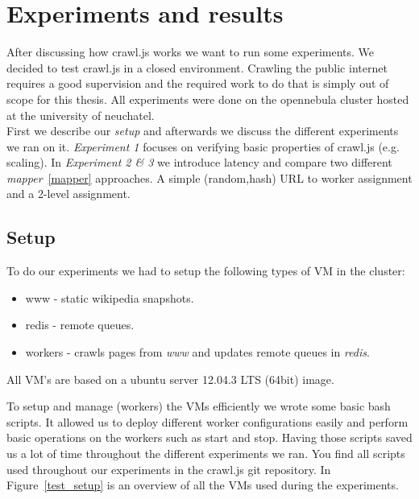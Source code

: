 
\chapter{Experiments and results} %

\label{Chapter5} %


After discussing how crawl.js works we want to run some experiments. We decided to test crawl.js in a closed environment. Crawling the public internet requires a good supervision and the required work to do that is simply out of scope for this thesis. All experiments were done on the opennebula cluster hosted at the university of neuchatel.
\\
First we describe our \emph{setup} and afterwards we discuss the different experiments we ran on it. \emph{Experiment 1} focuses on verifying basic properties of crawl.js (e.g. scaling). In \emph{Experiment 2 \& 3} we introduce latency and compare two different \emph{mapper}~\ref{mapper} approaches. A simple (random,hash) URL to worker assignment and a 2-level assignment.


\section{Setup}
To do our experiments we had to setup the following types of VM in the cluster:
\begin{itemize}
\item www - static wikipedia snapshots.
\item redis - remote queues.
\item workers - crawls pages from \emph{www} and updates remote queues in \emph{redis}.
\end{itemize}
All VM's are based on a ubuntu server 12.04.3 LTS (64bit) image.

To setup and manage (workers) the VMs efficiently we wrote some basic bash scripts. It allowed us to deploy different worker configurations easily and perform basic operations on the workers such as start and stop. Having those scripts saved us a lot of time throughout the different experiments we ran. You find all scripts used throughout our experiments in the crawl.js git repository. In Figure~\ref{test_setup} is an overview of all the VMs used during the experiments.

